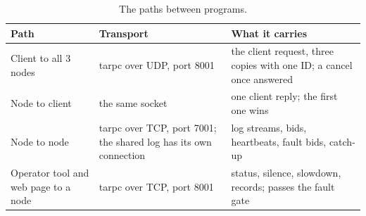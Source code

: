 \begin{table}[!htb]
\centering\small
\caption{The paths between programs.}
\label{tab:paths}
\begin{tabularx}{\linewidth}{@{}P{3.4cm}P{3.6cm}L@{}}
\toprule
Path & Transport & What it carries \\
\midrule
Client to all 3 nodes & tarpc over UDP, port 8001 & the client request, three copies with one ID; a cancel once answered \\
Node to client & the same socket & one client reply; the first one wins \\
Node to node & tarpc over TCP, port 7001; the shared log has its own connection & log streams, bids, heartbeats, fault bids, catch-up \\
Operator tool and web page to a node & tarpc over TCP, port 8001 & status, silence, slowdown, records; passes the fault gate \\
\bottomrule
\end{tabularx}
\end{table}


